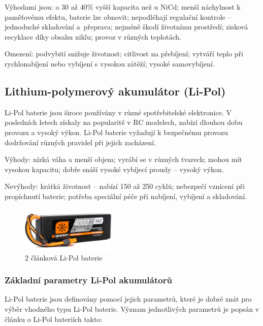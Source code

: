 Výhodami jsou: o 30 až $40\%$ vyšší kapacita než u NiCd; menší náchylnost k paměťovému efektu, baterie lze obnovit; nepodléhají regulační kontrole -- jednoduché skladování a~přeprava; nejméně škodí životnímu prostředí; zisková recyklace díky obsahu niklu; provoz v různých teplotách.

Omezení: podvybití snižuje životnost; citlivost na přebíjení; vytváří teplo při rychlonabíjení nebo vybíjení s vysokou zátěží; vysoké samovybíjení.


\subsection*{Lithium-polymerový akumulátor (Li-Pol)}
Li-Pol baterie \cite{batLipo} jsou široce používány v různé spotřebitelské elektronice. V posledních letech získaly na popularitě v RC modelech, nabízí dlouhou dobu provozu a vysoký výkon. Li-Pol baterie vyžadují k bezpečnému provozu dodržování různých pravidel při jejich zacházení.

Výhody: nízká váha a menší objem; vyrábí se v různých tvarech; mohou mít vysokou kapacitu; dobře snáší vysoké vybíjecí proudy -- vysoký výkon.

Nevýhody: krátká životnost -- nabízí 150 až 250 cyklů; nebezpečí vznícení při propíchnutí baterie; potřeba speciální péče při nabíjení, vybíjení a skladování.

\begin{figure}[hbt]
	\centering
	\includegraphics[width=0.4\textwidth]{obrazky-figures/lipo72.jpg}
	\caption[lipo]{2 článková Li-Pol baterie\footnotemark}
	\label{lipo}
\end{figure}


\subsubsection*{Základní parametry Li-Pol akumulátorů}
Li-Pol baterie jsou definovány pomocí jejich parametrů, které je dobré znát pro výběr vhodného typu Li-Pol baterie. Význam jednotlivých parametrů je popsán v článku o Li-Pol bateriích \cite{batLipo} takto:

